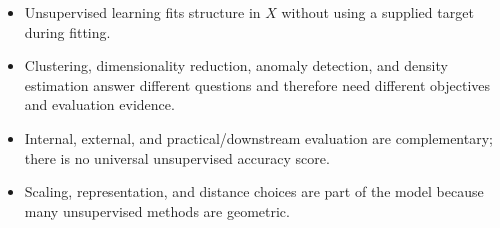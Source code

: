 \begin{chapterrecap}
\begin{itemize}
  \item Unsupervised learning fits structure in $X$ without using a supplied target during fitting.
  \item Clustering, dimensionality reduction, anomaly detection, and density estimation answer different questions and therefore need different objectives and evaluation evidence.
  \item Internal, external, and practical/downstream evaluation are complementary; there is no universal unsupervised accuracy score.
  \item Scaling, representation, and distance choices are part of the model because many unsupervised methods are geometric.
\end{itemize}
\end{chapterrecap}
